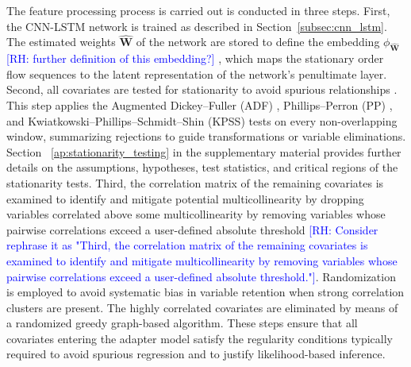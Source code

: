 \documentclass[10pt,a4paper,oneside]{article}
\newcommand{\rh}[1]{\textcolor{blue}{\textsf{[RH: #1]}}}
\providecommand{\DIFaddtex}[1]{{\protect\color{blue} \sf #1}} %
\providecommand{\DIFdeltex}[1]{{\protect\color{red} \scriptsize #1}} %
\providecommand{\DIFaddbegin}{} %
\providecommand{\DIFaddend}{} %
\providecommand{\DIFdelbegin}{} %
\providecommand{\DIFdelend}{} %
\providecommand{\DIFadd}[1]{\texorpdfstring{\DIFaddtex{#1}}{#1}} %
\providecommand{\DIFdel}[1]{\texorpdfstring{\DIFdeltex{#1}}{}} %
\newcommand{\DIFscaledelfig}{0.5}
\newlength{\DIFdelgraphicswidth} %
\newlength{\DIFdelgraphicsheight} %
\newcommand{\DIFaddincludegraphics}[2][]{{\color{blue}\fbox{\DIFOincludegraphics[#1]{#2}}}} %
\newcommand{\DIFdelincludegraphics}[2][]{%
\sbox{\DIFdelgraphicsbox}{\DIFOincludegraphics[#1]{#2}}%
\settoboxwidth{\DIFdelgraphicswidth}{\DIFdelgraphicsbox} %
\settoboxtotalheight{\DIFdelgraphicsheight}{\DIFdelgraphicsbox} %
\scalebox{\DIFscaledelfig}{%
\parbox[b]{\DIFdelgraphicswidth}{\usebox{\DIFdelgraphicsbox}\\[-\baselineskip] \rule{\DIFdelgraphicswidth}{0em}}\llap{\resizebox{\DIFdelgraphicswidth}{\DIFdelgraphicsheight}{%
\setlength{\unitlength}{\DIFdelgraphicswidth}%
\begin{picture}(1,1)%
\thicklines\linethickness{2pt} %
{\color[rgb]{1,0,0}\put(0,0){\framebox(1,1){}}}%
{\color[rgb]{1,0,0}\put(0,0){\line( 1,1){1}}}%
{\color[rgb]{1,0,0}\put(0,1){\line(1,-1){1}}}%
\end{picture}%
}\hspace*{3pt}}} %
} %
\DeclareRobustCommand{\DIFaddbegin}{\DIFOaddbegin \let\includegraphics\DIFaddincludegraphics} %
\DeclareRobustCommand{\DIFaddend}{\DIFOaddend \let\includegraphics\DIFOincludegraphics} %
\DeclareRobustCommand{\DIFdelbegin}{\DIFOdelbegin \let\includegraphics\DIFdelincludegraphics} %
\DeclareRobustCommand{\DIFdelend}{\DIFOaddend \let\includegraphics\DIFOincludegraphics} %
\begin{document}
The feature processing \DIFdelbegin \DIFdel{process is carried out }\DIFdelend \DIFaddbegin \DIFadd{is conducted }\DIFaddend in three steps. First, the CNN-LSTM network is trained as described in Section~\ref{subsec:cnn_lstm}. The estimated weights $\hat{\mathbf{W}}$ of the network are stored to define the embedding $\phi_{\hat{\mathbf{W}}}$\DIFdelbegin \DIFdel{\rh{further definition of this embedding?}}\DIFdelend \DIFaddbegin \DIFadd{, which maps the stationary order flow sequences to the latent representation of the network's penultimate layer}\DIFaddend . Second, all covariates are tested for stationarity to avoid spurious relationships \cite{granger1974spurious, phillips1986understanding}. This step applies the Augmented Dickey--Fuller (ADF) \cite{said1984testing, hamilton_time_1994, banerjee1993co}, Phillips--Perron (PP) \cite{phillips1986understanding, hamilton_time_1994, banerjee1993co}, and Kwiatkowski--Phillips--Schmidt--Shin (KPSS) \cite{kwiatkowski1992testing} tests on every non-overlapping window, summarizing rejections to guide transformations or variable eliminations. Section\DIFaddbegin \DIFadd{~}\DIFaddend \ref{ap:stationarity_testing} in the supplementary material provides further details on the assumptions, hypotheses, test statistics, and critical regions of the stationarity tests. Third, the correlation matrix of the remaining covariates is examined to identify and mitigate \DIFdelbegin \DIFdel{potential multicollinearity by dropping variables correlated above some }\DIFdelend \DIFaddbegin \DIFadd{multicollinearity by removing variables whose pairwise correlations exceed a }\DIFaddend user-defined absolute threshold\DIFdelbegin \DIFdel{\rh{Consider rephrase it as "Third, the correlation matrix of the remaining covariates is examined to identify and mitigate multicollinearity by removing variables whose pairwise correlations exceed a user-defined absolute threshold."}}\DIFdelend . Randomization is employed to avoid systematic bias in variable retention when strong correlation clusters are present. The highly correlated covariates are eliminated by means of a randomized greedy graph-based algorithm. These steps ensure that all covariates entering the adapter model satisfy the regularity conditions typically required to avoid spurious regression and to justify likelihood-based inference.

\end{document}
